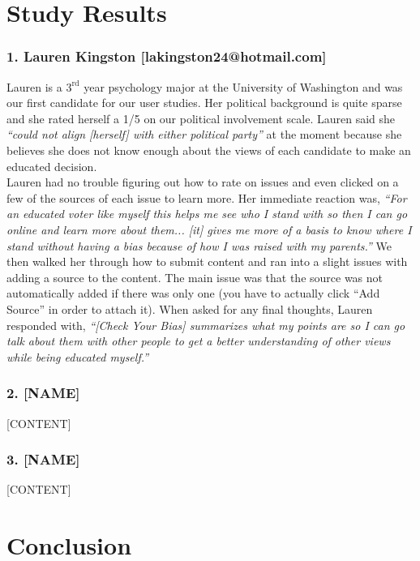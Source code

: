 \documentclass[11pt]{article}
\begin{document}
\section*{Study Results}

\subsubsection{1. Lauren Kingston [lakingston24@hotmail.com]}

Lauren is a $3^{\text{rd}}$ year psychology major at the University of Washington and was our first candidate for our user studies. Her political background is quite sparse and she rated herself a 1/5 on our political involvement scale. Lauren said she {\em``could not align [herself] with either political party''} at the moment because she believes she does not know enough about the views of each candidate to make an educated decision.\\[-9pt]

Lauren had no trouble figuring out how to rate on issues and even clicked on a few of the sources of each issue to learn more. Her immediate reaction was, {\em ``For an educated voter like myself this helps me see who I stand with so then I can go online and learn more about them... [it] gives me more of a basis to know where I stand without having a bias because of how I was raised with my parents.''} We then walked her through how to submit content and ran into a slight issues with adding a source to the content. The main issue was that the source was not automatically added if there was only one (you have to actually click ``Add Source'' in order to attach it). When asked for any final thoughts, Lauren responded with, {\em``[Check Your Bias] summarizes what my points are so I can go talk about them with other people to get a better understanding of other views while being educated myself.''}

\subsubsection{2. [NAME]}

[CONTENT]

\subsubsection{3. [NAME]}

[CONTENT]

\section*{Conclusion}
\end{document}
